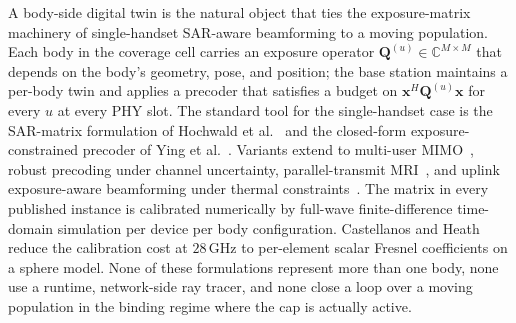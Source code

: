 \documentclass[journal,twocolumn,10pt]{IEEEtran}
\theoremstyle{plain}
\theoremstyle{remark}
\newcommand{\xx}{\mathbf{x}}
\newcommand{\Qmat}{\mathbf{Q}}
\newcommand{\Complex}{\mathbb{C}}
\begin{document}
A body-side digital twin is the natural object that ties the
exposure-matrix machinery of single-handset SAR-aware beamforming
to a moving population. Each body in the coverage cell carries an
exposure operator $\Qmat^{(u)} \in \Complex^{M\times M}$ that depends
on the body's geometry, pose, and position; the base station maintains
a per-body twin and applies a precoder that satisfies a budget on
$\xx^H \Qmat^{(u)} \xx$ for every $u$ at every PHY slot. The standard
tool for the single-handset case is the SAR-matrix formulation of
Hochwald et al.~\cite{Hochwald2014} and the closed-form
exposure-constrained precoder of Ying et al.~\cite{Ying2015}. Variants
extend to multi-user MIMO~\cite{Ying2017}, robust precoding under
channel uncertainty, parallel-transmit
MRI~\cite{MeliadoSAR2020,GokyarpTx2023}, and uplink exposure-aware
beamforming under thermal constraints~\cite{ZhouUL2026}. The matrix
in every published instance is calibrated numerically by full-wave
finite-difference time-domain simulation per device per body
configuration. Castellanos and Heath~\cite{Castellanos2020} reduce the
calibration cost at $28\,$GHz to per-element scalar Fresnel
coefficients on a sphere model. None of these formulations represent
more than one body, none use a runtime, network-side ray tracer, and
none close a loop over a moving population in the binding regime
where the cap is actually active.
\end{document}
